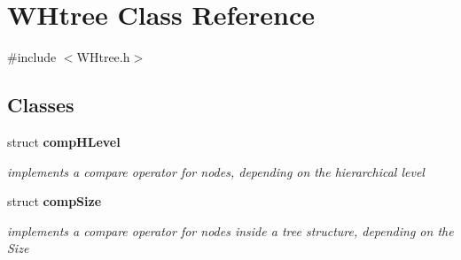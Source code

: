 \hypertarget{classWHtree}{\section{\-W\-Htree \-Class \-Reference}
\label{classWHtree}
}


{\ttfamily \#include $<$\-W\-Htree.\-h$>$}

\subsection*{\-Classes}
\begin{DoxyCompactItemize}
\item 
struct {\bfseries comp\-H\-Level}
\begin{DoxyCompactList}\small\item\em implements a compare operator for nodes, depending on the hierarchical level \end{DoxyCompactList}\item 
struct {\bfseries comp\-Size}
\begin{DoxyCompactList}\small\item\em implements a compare operator for nodes inside a tree structure, depending on the \-Size \end{DoxyCompactList}\end{DoxyCompactItemize}

